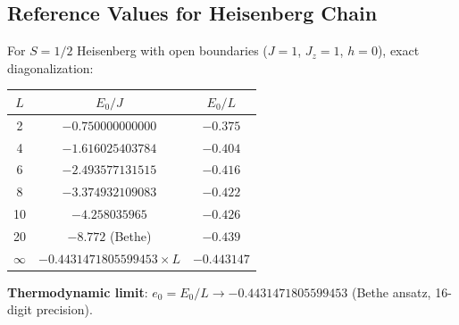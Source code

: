 \documentclass[aps,prb,onecolumn,scriptaddress]{revtex4-2}
\begin{document}
\subsection{Reference Values for Heisenberg Chain}

For $S=1/2$ Heisenberg with open boundaries ($J=1$, $J_z=1$, $h=0$), exact diagonalization:

\begin{center}
\begin{tabular}{@{}ccc@{}}
\toprule
$L$ & $E_0 / J$ & $E_0 / L$ \\
\midrule
2 & $-0.750000000000$ & $-0.375$ \\
4 & $-1.616025403784$ & $-0.404$ \\
6 & $-2.493577131515$ & $-0.416$ \\
8 & $-3.374932109083$ & $-0.422$ \\
10 & $-4.258035965$ & $-0.426$ \\
20 & $-8.772$ (Bethe) & $-0.439$ \\
$\infty$ & $-0.4431471805599453 \times L$ & $-0.443147$ \\
\bottomrule
\end{tabular}
\end{center}

\textbf{Thermodynamic limit}: $e_0 = E_0/L \to -0.4431471805599453$ (Bethe ansatz, 16-digit precision).
\end{document}
